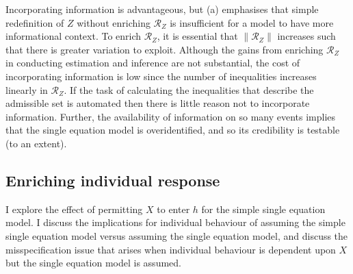 \documentclass[10pt,a4paper,twoside]{article}
\numberwithin{equation}{section}
\begin{document}
Incorporating information is advantageous, but (a) emphasises that simple redefinition of $Z$ without enriching $\mathcal{R}_Z$ is insufficient for a model to have more informational context. To enrich $\mathcal{R}_Z$, it is essential that $\|\mathcal{R}_Z\|$ increases such that there is greater variation to exploit. Although the gains from enriching $\mathcal{R}_Z$ in conducting estimation and inference are not substantial, the cost of incorporating information is low since the number of inequalities increases linearly in $\mathcal{R}_Z$. If the task of calculating the inequalities that describe the admissible set is automated then there is little reason not to incorporate information. Further, the availability of information on so many events implies that the single equation model is overidentified, and so its credibility is testable (to an extent).
\subsection{Enriching individual response}
I explore the effect of permitting $X$ to enter $h$ for the simple single equation model. I discuss the implications for individual behaviour of assuming the simple single equation model versus assuming the single equation model, and discuss the misspecification issue that arises when individual behaviour is dependent upon $X$ but the single equation model is assumed. 
\end{document}
